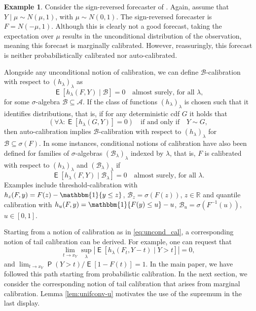 \documentclass[12pt]{article}
\newcommand{\one}{\mathbbm{1}}
\newcommand{\E}{\operatorname{\mathsf{E}}}
\newcommand{\Q}{\operatorname{\mathsf{P}}}
\newcommand{\R}{\mathbb{R}}
\newcommand{\Aa}{\mathcal{A}}
\newcommand{\Bb}{\mathcal{B}}
\newcommand{\1}{\mathbf{1}} %
\renewcommand{\subset}{\subseteq}
\theoremstyle{definition}
\newtheorem{example}[propo]{Example}
\begin{document}
\begin{example}\label{ex:2}
    Consider the sign-reversed forecaster of \cite{GneitingEtAl2007}. Again, assume that $Y \mid \mu \sim N(\mu, 1)$, with $\mu \sim N(0, 1)$. The sign-reversed forecaster is  $F = N(-\mu, 1)$.
    Although this is clearly not a good forecast, taking the expectation over $\mu$ results in the unconditional distribution of the observation, meaning this forecast is marginally calibrated. However, reassuringly, this forecast is neither probabilistically calibrated nor auto-calibrated.
\end{example}

Alongside any unconditional notion of calibration, we can define $\Bb$-calibration with respect to $(h_\lambda)_\lambda$ as
\begin{equation}\label{eq:uncond_cal}
\E[ h_\lambda(F,Y) \mid \Bb]= 0 \quad \text{almost surely, for all $\lambda$,}
\end{equation}
for some $\sigma$-algebra $\Bb \subset \Aa$. If the class of functions $(h_\lambda)_\lambda$ is chosen such that it identifies distributions, that is, if for any deterministic cdf $G$ it holds that
\[
	\left( \forall \lambda : \E [h_\lambda(G,Y)] = 0 \right)
	\quad \text{if and only if} \quad Y \sim G,
\]
then auto-calibration implies $\Bb$-calibration with respect to $(h_\lambda)_\lambda$ for $\Bb \subseteq \sigma(F)$. In some instances, conditional notions of calibration have also been defined for families of $\sigma$-algebras $(\Bb_\lambda)_\lambda$ indexed by $\lambda$, that is, $F$ is calibrated with respect to $(h_\lambda)_\lambda$ and $(\Bb_\lambda)_\lambda$ if
\[
\E[ h_\lambda(F,Y) \mid \Bb_\lambda]= 0 \quad \text{almost surely, for all $\lambda$.}
\]
Examples include threshold-calibration with $h_z(F,y) = F(z) - \one\{y \le z\}$, $\Bb_z = \sigma(F(z))$, $z \in \R$ and quantile calibration with $h_u(F,y) = \one\{F(y)\le u\}-u$, $\Bb_u = \sigma(F^{-1}(u))$, $u \in [0,1]$. 

Starting from a notion of calibration as in \eqref{eq:uncond_cal}, a corresponding notion of tail calibration can be derived. For example, one can request that 
\[
\lim_{t \to x_Y} \sup_{\lambda}|\E[ h_\lambda (F_t,Y-t) \mid Y >t]| = 0,
\]
and $\lim_{t \to x_Y} \Q(Y>t)/\E[1-F(t)] = 1$. In the main paper, we have followed this path starting from probabilistic calibration. In the next section, we consider the corresponding notion of tail calibration that arises from marginal calibration. Lemma \ref{lem:unifconv-u} motivates the use of the supremum in the last display.
\end{document}
